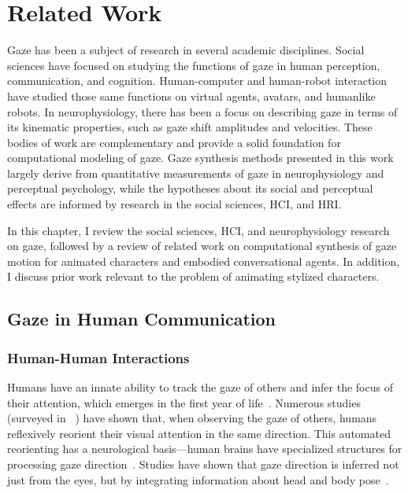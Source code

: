 \pagestyle{deposit}

\chapter{Related Work}

Gaze has been a subject of research in several academic disciplines. Social sciences have focused on studying the functions of gaze in human perception, communication, and cognition. Human-computer and human-robot interaction have studied those same functions on virtual agents, avatars, and humanlike robots. In neurophysiology, there has been a focus on describing gaze in terms of its kinematic properties, such as gaze shift amplitudes and velocities. These bodies of work are complementary and provide a solid foundation for computational modeling of gaze. Gaze synthesis methods presented in this work largely derive from quantitative measurements of gaze in neurophysiology and perceptual psychology, while the hypotheses about its social and perceptual effects are informed by research in the social sciences, HCI, and HRI.

In this chapter, I review the social sciences, HCI, and neurophysiology research on gaze, followed by a review of related work on computational synthesis of gaze motion for animated characters and embodied conversational agents. In addition, I discuss prior work relevant to the problem of animating stylized characters.

\section{Gaze in Human Communication}
\label{sec:GazeHumanCommunication}

\subsection{Human-Human Interactions}

Humans have an innate ability to track the gaze of others and infer the focus of their attention, which emerges in the first year of life~\citep{scaife1975infant,vecera1995detection}. Numerous studies (surveyed in ~\citep{langton2000eyes}) have shown that, when observing the gaze of others, humans reflexively reorient their visual attention in the same direction. This automated reorienting has a neurological basis---human brains have specialized structures for processing gaze direction~\citep{emery2000eyes}. Studies have shown that gaze direction is inferred not just from the eyes, but by integrating information about head and body pose~\citep{hietanen1999does,langton2000eyes,hietanen2002social,pomianowska2011socialcues}.


